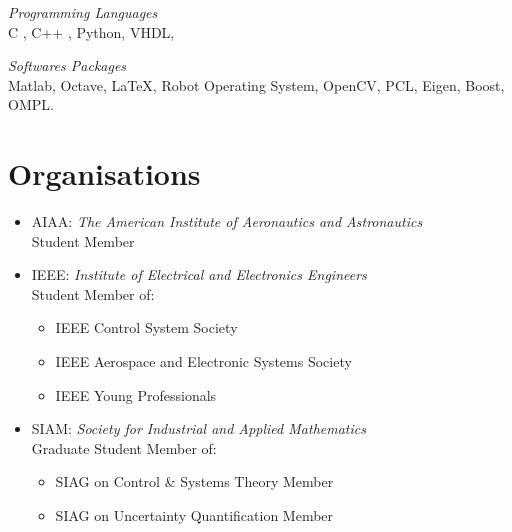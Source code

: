 \documentclass[margin,line]{resume}
\begin{document}
\begin{resume}
	\emph{Programming Languages}\\ C , C++ , Python, VHDL, 
	
	\vspace{-2mm}

    \vspace{-2mm}
	\emph{Softwares Packages}\\
	Matlab, Octave, \LaTeX, Robot Operating System, OpenCV, PCL, Eigen, Boost, OMPL. 

    \section{\mysidestyle Organisations}
    \begin{itemize}
        \item AIAA: \emph{The American Institute of Aeronautics and Astronautics}\\
        Student Member
        \item IEEE: \emph{Institute of Electrical and Electronics Engineers}\\
        Student Member of:
        \begin{itemize}
            \item IEEE Control System Society
            \item IEEE Aerospace and Electronic Systems Society
            \item IEEE Young Professionals
        \end{itemize}
        \item SIAM: \emph{Society for Industrial and Applied Mathematics}\\
        Graduate Student Member of:
            \begin{itemize}
                \item  SIAG on Control \& Systems Theory Member
                \item SIAG on Uncertainty Quantification Member
            \end{itemize}
    \end{itemize}

\end{resume}
\end{document}
